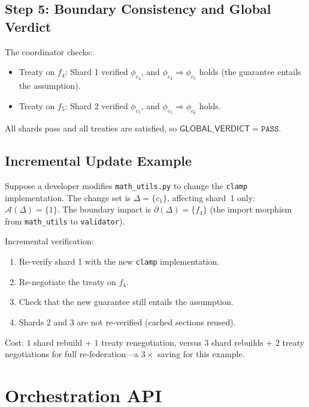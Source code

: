 \documentclass[11pt]{article}
\newcommand{\GlobalVerdict}{\ensuremath{\mathsf{GLOBAL\_VERDICT}}}
\begin{document}
\subsection{Step 5: Boundary Consistency and Global Verdict}

The coordinator checks:
\begin{itemize}[noitemsep]
  \item Treaty on $f_4$: Shard 1 verified $\phi_{c_4}$, and
        $\phi_{c_4} \Rightarrow \phi_{c_5}$ holds (the guarantee
        entails the assumption).  \checkmark
  \item Treaty on $f_5$: Shard 2 verified $\phi_{c_5}$, and
        $\phi_{c_5} \Rightarrow \phi_{c_6}$ holds.  \checkmark
\end{itemize}

All shards pass and all treaties are satisfied, so
$\GlobalVerdict = \texttt{PASS}$.

\subsection{Incremental Update Example}

Suppose a developer modifies \texttt{math\_utils.py} to change the
\texttt{clamp} implementation.  The change set is $\Delta = \{c_1\}$,
affecting shard~1 only: $\mathcal{A}(\Delta) = \{1\}$.  The boundary
impact is $\partial(\Delta) = \{f_4\}$ (the import morphism from
\texttt{math\_utils} to \texttt{validator}).

Incremental verification:
\begin{enumerate}[noitemsep]
  \item Re-verify shard 1 with the new \texttt{clamp} implementation.
  \item Re-negotiate the treaty on $f_4$.
  \item Check that the new guarantee still entails the assumption.
  \item Shards 2 and 3 are not re-verified (cached sections reused).
\end{enumerate}

Cost: $1$ shard rebuild + $1$ treaty renegotiation, versus $3$ shard
rebuilds + $2$ treaty negotiations for full re-federation---a
$3\times$ saving for this example.


\section{Orchestration API}\label{sec:orchestration-api}
\end{document}
